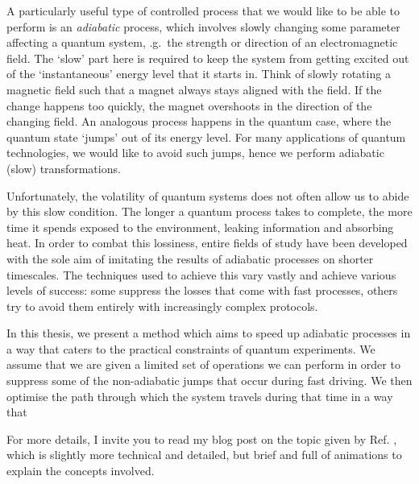 A particularly useful type of controlled process that we would like to be able to perform is an \emph{adiabatic} process, which involves slowly changing some parameter affecting a quantum system, \@e.g.~the strength or direction of an electromagnetic field. The `slow' part here is required to keep the system from getting excited out of the `instantaneous' energy level that it starts in. Think of slowly rotating a magnetic field such that a magnet always stays aligned with the field. If the change happens too quickly, the magnet overshoots in the direction of the changing field. An analogous process happens in the quantum case, where the quantum state `jumps' out of its energy level. For many applications of quantum technologies, we would like to avoid such jumps, hence we perform adiabatic (slow) transformations.

Unfortunately, the volatility of quantum systems does not often allow us to abide by this slow condition. The longer a quantum process takes to complete, the more time it spends exposed to the environment, leaking information and absorbing heat. In order to combat this lossiness, entire fields of study have been developed with the sole aim of imitating the results of adiabatic processes on shorter timescales. The techniques used to achieve this vary vastly and achieve various levels of success: some suppress the losses that come with fast processes, others try to avoid them entirely with increasingly complex protocols.

In this thesis, we present a method which aims to speed up adiabatic processes in a way that caters to the practical constraints of quantum experiments. We assume that we are given a limited set of operations we can perform in order to suppress some of the non-adiabatic jumps that occur during fast driving. We then optimise the path through which the system travels during that time in a way that 

For more details, I invite you to read my blog post on the topic given by Ref. \cite{cepaite_cold_2023}, which is slightly more technical and detailed, but brief and full of animations to explain the concepts involved. 
